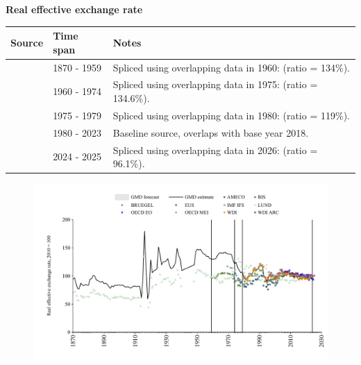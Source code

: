 \documentclass[12pt,a4paper,landscape]{article}
\begin{document}
\begin{adjustbox}{max totalsize={\paperwidth}{\paperheight},center}
\begin{minipage}[t][\textheight][t]{\textwidth}
\vspace*{0.5cm}
{}
\begin{center}
{\Large\bfseries Real effective exchange rate}
\end{center}
\vspace{0.5cm}
\begin{table}[H]
\centering
\small
\begin{tabular}{|l|l|l|}
\hline
\textbf{Source} & \textbf{Time span} & \textbf{Notes} \\
\hline
\rowcolor{white}\cite{LUND}& 1870 - 1959 &Spliced using overlapping data in 1960: (ratio = 134\%). \\
\rowcolor{lightgray}\cite{BRUEGEL}& 1960 - 1974 &Spliced using overlapping data in 1975: (ratio = 134.6\%). \\
\rowcolor{white}\cite{WDI_ARC}& 1975 - 1979 &Spliced using overlapping data in 1980: (ratio = 119\%). \\
\rowcolor{lightgray}\cite{WDI}& 1980 - 2023 &Baseline source, overlaps with base year 2018. \\
\rowcolor{white}\cite{BIS}& 2024 - 2025 &Spliced using overlapping data in 2026: (ratio = 96.1\%). \\
\hline
\end{tabular}
\end{table}
\begin{figure}[H]
\centering
\includegraphics[width=\textwidth,height=0.6\textheight,keepaspectratio]{graphs/ITA_REER.pdf}
\end{figure}
\end{minipage}
\end{adjustbox}
\end{document}
